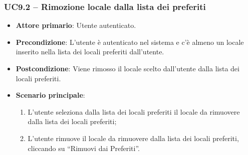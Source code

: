 \subsubsection{UC9.2 – Rimozione locale dalla lista dei preferiti}

\begin{itemize}
    \item \textbf{Attore primario}: Utente autenticato.
    \item \textbf{Precondizione}:  L’utente è autenticato nel sistema e c'è almeno un locale inserito nella lista dei locali preferiti dall’utente.
    \item \textbf{Postcondizione}: Viene rimosso il locale scelto dall’utente dalla lista dei locali preferiti.
    \item \textbf{Scenario principale}:
    \begin{enumerate}
        \item L’utente seleziona dalla lista dei locali preferiti il locale da rimuovere dalla lista dei locali preferiti;
        \item L’utente rimuove il locale da rimuovere dalla lista dei locali preferiti, cliccando su “Rimuovi dai Preferiti”.
    \end{enumerate}
\end{itemize}
